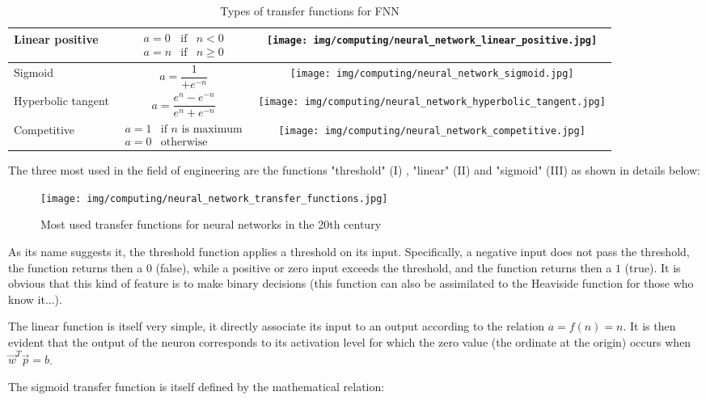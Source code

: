 \begin{table}[H]
\begin{center}
\begin{tabular}{|l||c|c|}
					Linear positive & $\begin{matrix}a=0 & \text{if} & n<0\\a=n & \text{if} & n\geq 0 \end{matrix}$ & \parbox{1.5cm}{\texttt{[image: img/computing/neural\_network\_linear\_positive.jpg]}}\\ \hline
					Sigmoid & $a=\dfrac{1}{+e^{-n}}$ & \parbox{1.5cm}{\texttt{[image: img/computing/neural\_network\_sigmoid.jpg]}}\\ \hline
					Hyperbolic tangent & $a=\dfrac{e^n-e^{-n}}{e^n+e^{-n}}$ & \parbox{1.5cm}{\texttt{[image: img/computing/neural\_network\_hyperbolic\_tangent.jpg]}}\\ \hline
					Competitive & $\begin{matrix}a=1 & \text{if } n \text{ is maximum} \\ a=0 & \text{otherwise} \end{matrix}$ & \parbox{1.5cm}{\texttt{[image: img/computing/neural\_network\_competitive.jpg]}}\\ \hline
				\end{tabular}
		\end{center}
		\caption[]{Types of transfer functions for FNN}
	\end{table}
	The three most used in the field of engineering are the functions "threshold" (I) , "linear" (II) and "sigmoid" (III) as shown in details below:
	\begin{figure}[H]
		\centering
		\texttt{[image: img/computing/neural\_network\_transfer\_functions.jpg]}
		\caption{Most used transfer functions for neural networks in the 20th century}
	\end{figure}
	As its name suggests it, the threshold function applies a threshold on its input. Specifically, a negative input does not pass the threshold, the function returns then a $0$ (false), while a positive or zero input exceeds the threshold, and the function returns then a $1$ (true). It is obvious that this kind of feature is to make binary decisions (this function can also be assimilated to the Heaviside function for those who know it...).
	
	The linear function is itself very simple, it directly associate its input to an output according to the relation $a=f(n)=n$. It is then evident that the output of the neuron corresponds to its activation level for which the zero value (the ordinate at the origin) occurs when $\vec{w}^T\vec{p}=b$.
	
	The sigmoid transfer function is itself defined by the mathematical relation:
	
